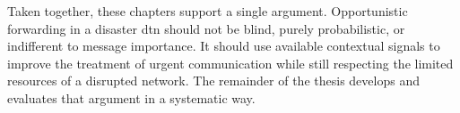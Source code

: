 Taken together, these chapters support a single argument. Opportunistic forwarding in a disaster \ac{dtn} should not be blind, purely probabilistic, or indifferent to message importance. It should use available contextual signals to improve the treatment of urgent communication while still respecting the limited resources of a disrupted network. The remainder of the thesis develops and evaluates that argument in a systematic way.
